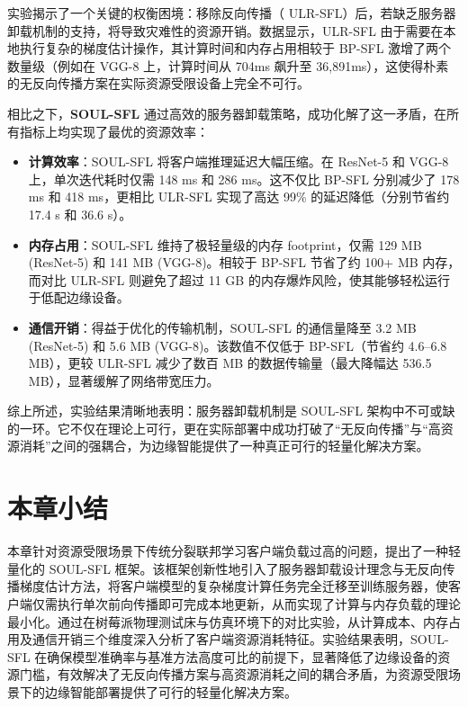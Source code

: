 实验揭示了一个关键的权衡困境：移除反向传播（ ULR-SFL）后，若缺乏服务器卸载机制的支持，将导致灾难性的资源开销。数据显示，ULR-SFL 由于需要在本地执行复杂的梯度估计操作，其计算时间和内存占用相较于 BP-SFL 激增了两个数量级（例如在 VGG-8 上，计算时间从 704ms 飙升至 36,891ms），这使得朴素的无反向传播方案在实际资源受限设备上完全不可行。

相比之下，\textbf{SOUL-SFL} 通过高效的服务器卸载策略，成功化解了这一矛盾，在所有指标上均实现了最优的资源效率：
\begin{itemize}
    \item \textbf{计算效率}：SOUL-SFL 将客户端推理延迟大幅压缩。在 ResNet-5 和 VGG-8 上，单次迭代耗时仅需 148 ms 和 286 ms。这不仅比 BP-SFL 分别减少了 178 ms 和 418 ms，更相比 ULR-SFL 实现了高达 99\% 的延迟降低（分别节省约 17.4 s 和 36.6 s）。
    
    \item \textbf{内存占用}：SOUL-SFL 维持了极轻量级的内存 footprint，仅需 129 MB (ResNet-5) 和 141 MB (VGG-8)。相较于 BP-SFL 节省了约 100+ MB 内存，而对比 ULR-SFL 则避免了超过 11 GB 的内存爆炸风险，使其能够轻松运行于低配边缘设备。
    
    \item \textbf{通信开销}：得益于优化的传输机制，SOUL-SFL 的通信量降至 3.2 MB (ResNet-5) 和 5.6 MB (VGG-8)。该数值不仅低于 BP-SFL（节省约 4.6--6.8 MB），更较 ULR-SFL 减少了数百 MB 的数据传输量（最大降幅达 536.5 MB），显著缓解了网络带宽压力。
\end{itemize}

综上所述，实验结果清晰地表明：服务器卸载机制是 SOUL-SFL 架构中不可或缺的一环。它不仅在理论上可行，更在实际部署中成功打破了“无反向传播”与“高资源消耗”之间的强耦合，为边缘智能提供了一种真正可行的轻量化解决方案。

\section{本章小结}
本章针对资源受限场景下传统分裂联邦学习客户端负载过高的问题，提出了一种轻量化的 SOUL-SFL 框架。该框架创新性地引入了服务器卸载设计理念与无反向传播梯度估计方法，将客户端模型的复杂梯度计算任务完全迁移至训练服务器，使客户端仅需执行单次前向传播即可完成本地更新，从而实现了计算与内存负载的理论最小化。通过在树莓派物理测试床与仿真环境下的对比实验，从计算成本、内存占用及通信开销三个维度深入分析了客户端资源消耗特征。实验结果表明，SOUL-SFL 在确保模型准确率与基准方法高度可比的前提下，显著降低了边缘设备的资源门槛，有效解决了无反向传播方案与高资源消耗之间的耦合矛盾，为资源受限场景下的边缘智能部署提供了可行的轻量化解决方案。